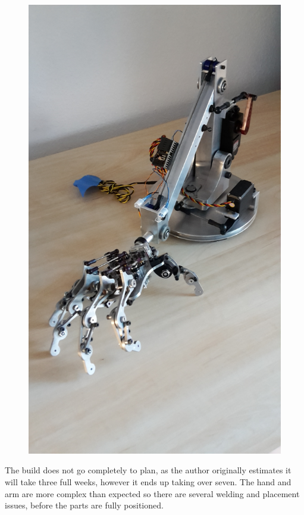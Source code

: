 \documentclass[progress]{cmpreport}
\begin{document}
{{{{{{\begin{figure}[H]
\begin{minipage}{0.455\textwidth}
		\includegraphics[width=1.1\textwidth, angle=-90]{photos/Day42-pt5.jpg}
	\end{minipage}
\end{figure}

The build does not go completely to plan, as the author originally estimates it will take three full weeks, however it ends up taking over seven. The hand and arm are more complex than expected so there are several welding and placement issues, before the parts are fully positioned. 

}}}}}}
\end{document}
